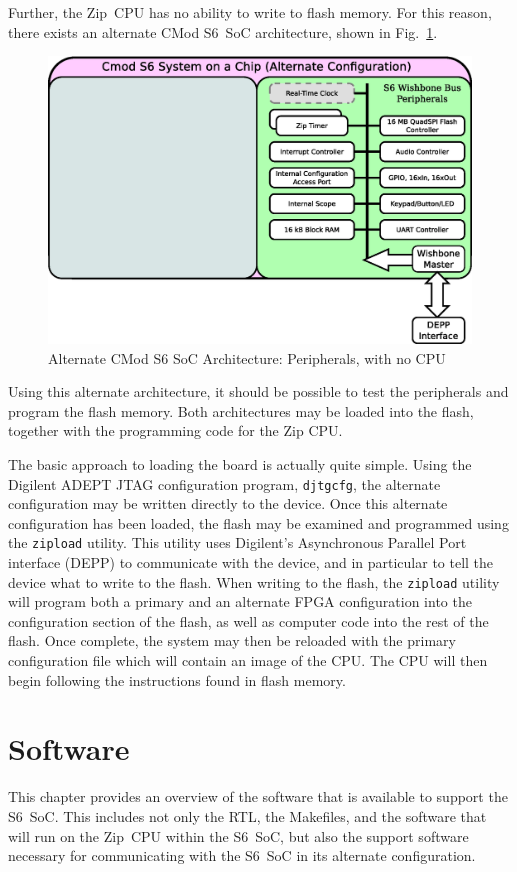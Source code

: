 \documentclass{gqtekspec}
\begin{document}
Further, the Zip~CPU has no ability to write to flash memory.  For this reason,
there exists an alternate CMod S6~SoC architecture, shown in
Fig.~\ref{fig:altarchitecture}.
\begin{figure}\begin{center}
\includegraphics[width=5in]{../gfx/altbones.eps}
\caption{Alternate CMod S6 SoC Architecture: Peripherals, with no
	CPU}\label{fig:altarchitecture}
\end{center}\end{figure}
Using this alternate architecture, it should be possible to test the peripherals
and program the flash memory.  Both architectures may be loaded into the flash,
together with the programming code for the Zip CPU.

The basic approach to loading the board is actually quite simple.  Using the
Digilent ADEPT JTAG configuration program, {\tt djtgcfg}, the alternate 
configuration may be written directly to the device.  Once this alternate
configuration has been loaded, the flash may be examined and programmed using
the {\tt zipload} utility.  This utility uses Digilent's Asynchronous Parallel
Port interface (DEPP) to communicate with the device, and in particular to 
tell the device what to write to the flash.  When writing to the flash,
the {\tt zipload} utility will program both a primary and an alternate
FPGA configuration into the configuration section of the flash, as well as
computer code into the rest of the flash.  Once complete, the system may then be
reloaded with the primary configuration file which will contain an image of
the CPU.  The CPU will then begin following the instructions found in flash
memory.


\chapter{Software}
This chapter provides an overview of the software that is available to support
the S6~SoC.  This includes not only the RTL, the Makefiles, and the software
that will run on the Zip~CPU within the S6~SoC, but also the support software
necessary for communicating with the S6~SoC in its alternate configuration.
\end{document}
